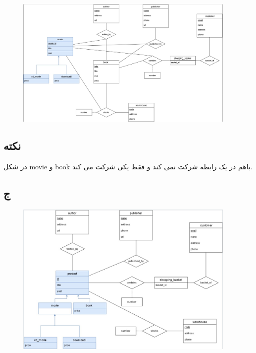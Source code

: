 \documentclass[a4paper]{article}
\makeatletter
\newcommand{\emailone}{\texttt{abbas.yazdanmehr1@gmail.com}}
\newcommand{\myinf}{
	\author{\noindent
عباس یزدان مهر
\\
99243077\\
 مهندسی کامپیوتر, دانشگاه شهید بهشتی
\\
\emailone
	}
}
\makeatother
\begin{document}
\begin{figure} [H]
  \begin{small}
    \begin{center}
      \includegraphics[width=0.95\textwidth]{figures/1.jpg}
    \end{center}
  \end{small}
\end{figure}

\subsection*{نکته}
در شکل movie و book باهم در یک رابطه شرکت نمی کند و فقط یکی شرکت می کند.

\newpage
\myinf
\subsection*{ج}
\begin{figure} [H]
  \begin{small}
    \begin{center}
      \includegraphics[width=0.95\textwidth]{figures/1-j.jpg}
    \end{center}
  \end{small}
\end{figure}
\end{document}
